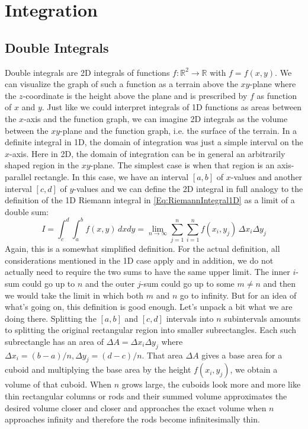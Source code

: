 \section{Integration}

\subsection{Double Integrals}
Double integrals are 2D integrals of functions $f: \mathbb{R}^2 \rightarrow \mathbb{R}$ with $f = f(x,y)$. We can visualize the graph of such a function as a terrain above the $xy$-plane where the $z$-coordinate is the height above the plane and is prescribed by $f$ as function of $x$ and $y$. Just like we could interpret integrals of 1D functions as areas between the $x$-axis and the function graph, we can imagine 2D integrals as the volume between the $xy$-plane and the function graph, i.e. the surface of the terrain. In a definite integral in 1D, the domain of integration was just a simple interval on the $x$-axis. Here in 2D, the domain of integration can be in general an arbitrarily shaped region in the $xy$-plane. The simplest case is when that region is an axis-parallel rectangle. In this case, we have an interval $[a,b]$ of $x$-values and another interval $[c,d]$ of $y$-values and we can define the 2D integral in full analogy to the definition of the 1D Riemann integral in \ref{Eq:RiemannIntegral1D} as a limit of a double sum:
\begin{equation}
 I =  \int_c^d \int_a^b f(x,y) \, dx dy = \lim_{n \rightarrow \infty} \sum_{j=1}^n \sum_{i=1}^n f(x_i, y_j) \, \Delta x_i \Delta y_j
\end{equation}
Again, this is a somewhat simplified definition. For the actual definition, all considerations mentioned in the 1D case apply and in addition, we do not actually need to require the two sums to have the same upper limit. The inner $i$-sum could go up to $n$ and the outer $j$-sum could go up to some $m \neq n$ and then we would take the limit in which both $m$ and $n$ go to infinity. But for an idea of what's going on, this definition is good enough. Let's unpack a bit what we are doing there. Splitting the $[a,b]$ and $[c,d]$ intervals into $n$ subintervals amounts to splitting the original rectangular region into smaller subrectangles. Each such subrectangle has an area of $\Delta A = \Delta x_i \Delta y_j$ where $\Delta x_i = (b-a)/n, \Delta y_j = (d-c)/n$. That area $\Delta A$ gives a base area for a cuboid and multiplying the base area by the height $f(x_i, y_j)$, we obtain a volume of that cuboid. When $n$ grows large, the cuboids look more and more like thin rectangular columns or rods and their summed volume approximates the desired volume closer and closer and approaches the exact volume when $n$ approaches infinity and therefore the rods become infinitesimally thin.

